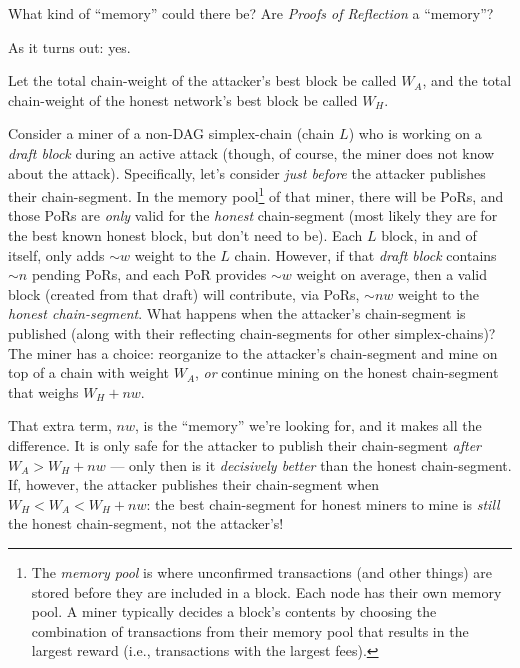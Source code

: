 What kind of ``memory'' could there be?
Are \emph{Proofs of Reflection} a ``memory''?

As it turns out: yes.

Let the total chain-weight of the attacker's best block be called $W_A$, and the total chain-weight of the honest network's best block be called $W_H$.

Consider a miner of a non-DAG simplex-chain (chain $L$) who is working on a \emph{draft block} during an active attack (though, of course, the miner does not know about the attack).
Specifically, let's consider \emph{just before} the attacker publishes their chain-segment.
In the memory pool\footnote{
  The \emph{memory pool} is where unconfirmed transactions (and other things) are stored before they are included in a block.
  Each node has their own memory pool.
  A miner typically decides a block's contents by choosing the combination of transactions from their memory pool that results in the largest reward (i.e., transactions with the largest fees).
} of that miner, there will be PoRs, and those PoRs are \emph{only} valid for the \emph{honest} chain-segment (most likely they are for the best known honest block, but don't need to be).
Each $L$ block, in and of itself, only adds $\sim w$ weight to the $L$ chain.
However, if that \emph{draft block} contains $\sim n$ pending PoRs, and each PoR provides $\sim w$ weight on average, then a valid block (created from that draft) will contribute, via PoRs, $\sim nw$ weight to the \emph{honest chain-segment}.
What happens when the attacker's chain-segment is published (along with their reflecting chain-segments for other simplex-chains)?
The miner has a choice: reorganize to the attacker's chain-segment and mine on top of a chain with weight $W_A$, \emph{or} continue mining on the honest chain-segment that weighs $W_H + nw$.

That extra term, $nw$, is the ``memory'' we're looking for, and it makes all the difference.
It is only safe for the attacker to publish their chain-segment \emph{after} $W_A > W_H + nw$ --- only then is it \emph{decisively better} than the honest chain-segment.
If, however, the attacker publishes their chain-segment when $W_H < W_A < W_H + nw$: the best chain-segment for honest miners to mine is \emph{still} the honest chain-segment, not the attacker's!

